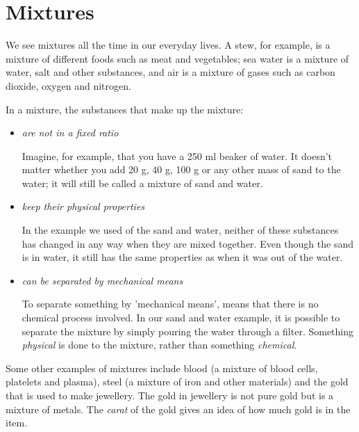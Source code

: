 
\section{Mixtures}
\label{sec:cm:mps}

We see mixtures all the time in our everyday lives. A stew, for example, is a mixture of different foods such as meat and vegetables; sea water is a mixture of water, salt and other substances, and air is a mixture of gases such as carbon dioxide, oxygen and nitrogen. 


In a mixture, the substances that make up the mixture:

\begin{itemize}
\item{\textit{are not in a fixed ratio}

Imagine, for example, that you have a 250 ml beaker of water. It doesn't matter whether you add 20 g, 40 g, 100 g or any other mass of sand to the water; it will still be called a mixture of sand and water.}

\item{\textit{keep their physical properties}

In the example we used of the sand and water, neither of these substances has changed in any way when they are mixed together. Even though the sand is in water, it still has the same properties as when it was out of the water.}

\item{\textit{can be separated by mechanical means}

To separate something by 'mechanical means', means that there is no chemical process involved. In our sand and water example, it is possible to separate the mixture by simply pouring the water through a filter. Something \textit{physical} is done to the mixture, rather than something \textit{chemical}.} 
\end{itemize}

Some other examples of mixtures include blood (a mixture of blood cells, platelets and plasma), steel (a mixture of iron and other materials) and the gold that is used to make jewellery. The gold in jewellery is not pure gold but is a mixture of metals. The \textit{carat} of the gold gives an idea of how much gold is in the item.\\ 

